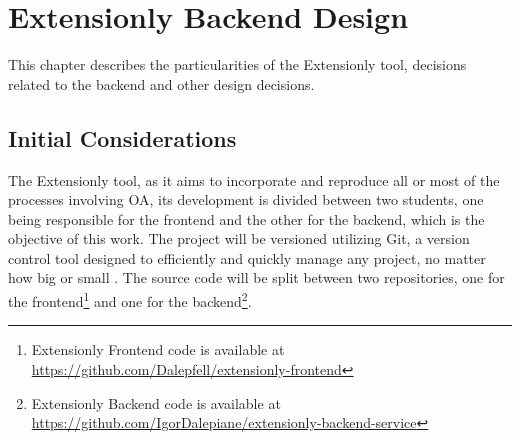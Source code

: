 \chapter{Extensionly Backend Design}\label{extensionly}


This chapter describes the particularities of the Extensionly tool, decisions related to the backend and other design decisions.

\section{Initial Considerations}\label{sec:ext-considerations}

The Extensionly tool, as it aims to incorporate and reproduce all or most of the processes involving \acl{OA}, its development is divided between two students, one being responsible for the frontend and the other for the backend, which is the objective of this work.
The project will be versioned utilizing Git, a version control tool designed to efficiently and quickly manage any project, no matter how big or small \cite{chacon2014pro}. The source code will be split between two repositories, one for the frontend\footnote{Extensionly Frontend code is available at \url{https://github.com/Dalepfell/extensionly-frontend}} and one for the backend\footnote{Extensionly Backend code is available at \url{https://github.com/IgorDalepiane/extensionly-backend-service}}.

